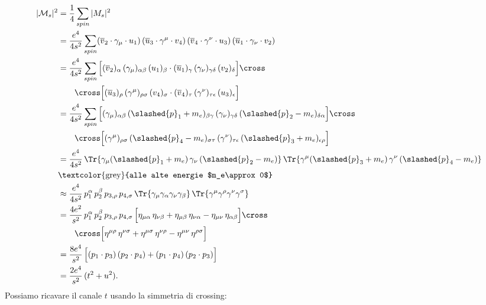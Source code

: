 \begin{align}
    |\mathcal{M}_s|^2 &= \frac{1}{4}\sum_{spin}|M_s|^2 \\
    &= \frac{e^4}{4s^2}\sum_{spin} (\overline{v}_2\cdot\gamma_\mu\cdot u_1)\, (\overline{u}_3\cdot\gamma^\mu\cdot v_4)\, (\overline{v}_4\cdot\gamma^\nu\cdot u_3)\, (\overline{u}_1\cdot\gamma_\nu\cdot v_2) \\
    &= \frac{e^4}{4s^2}\sum_{spin} \Big[ (\overline{v}_2)_\alpha\, (\gamma_\mu)_{\alpha\beta}\, (u_1)_{\beta}\cdot (\overline{u}_1)_\gamma\, (\gamma_\nu)_{\gamma\delta}\, (v_2)_{\delta} \Big]\cross \notag \\
    &\qquad \cross \Big[ (\overline{u}_3)_\rho\, (\gamma^\mu)_{\rho\sigma}\, (v_4)_{\sigma}\cdot (\overline{v}_4)_\tau\, (\gamma^\nu)_{\tau\epsilon}\, (u_3)_{\epsilon} \Big] \\
    &= \frac{e^4}{4s^2}\sum_{spin} \Big[ (\gamma_\mu)_{\alpha\beta}\, (\slashed{p}_1 + m_e)_{\beta\gamma}\, (\gamma_\nu)_{\gamma\delta}\, (\slashed{p}_2 - m_e)_{\delta\alpha} \Big] \cross \notag \\
    &\qquad \cross \Big[ (\gamma^\mu)_{\rho\sigma}\, (\slashed{p}_4 - m_e)_{\sigma\tau}\, (\gamma^\nu)_{\tau\epsilon}\, (\slashed{p}_3 + m_e)_{\epsilon\rho} \Big] \\
    &= \frac{e^4}{4s^2}\, \Tr{ \gamma_\mu(\slashed{p}_1 + m_e)\, \gamma_\nu\, (\slashed{p}_2 - m_e) }\, \Tr{ \gamma^\mu(\slashed{p}_3 + m_e)\, \gamma^\nu\, (\slashed{p}_4 - m_e) } \\
    &\text{\textcolor{grey}{alle alte energie $m_e\approx 0$}} \notag \\
    &\approx \frac{e^4}{4s^2}\, p_1^\alpha\, p_2^\beta\, p_{3,\rho}\, p_{4,\sigma}\, \Tr{\gamma_\mu\gamma_\alpha\gamma_\nu\gamma_\beta}\, \Tr{\gamma^\mu\gamma^\rho\gamma^\nu\gamma^\sigma} \\
    &= \frac{4e^2}{s^2}\, p_1^\alpha\, p_2^\beta\, p_{3,\rho}\, p_{4,\sigma}\, \Big[ \eta_{\mu\alpha}\, \eta_{\nu\beta} + \eta_{\mu\beta}\, \eta_{\nu\alpha} - \eta_{\mu\nu}\, \eta_{\alpha\beta} \Big]\cross \notag \\
    &\qquad \cross \Big[ \eta^{\mu\rho}\, \eta^{\nu\sigma} + \eta^{\mu\sigma}\, \eta^{\nu\rho} - \eta^{\mu\nu}\, \eta^{\rho\sigma} \Big] \\
    &= \frac{8e^4}{s^2}\, \Big[ (p_1\cdot p_3)\, (p_2\cdot p_4) + (p_1\cdot p_4)\, (p_2\cdot p_3) \Big] \\
    &= \frac{2e^4}{s^2}\, (t^2 + u^2).
\end{align}
Possiamo ricavare il canale $t$ usando la simmetria di crossing:
